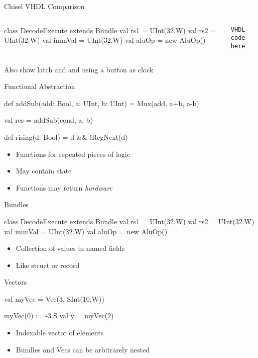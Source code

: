 \documentclass[xcolor=pdflatex,dvipsnames,table]{beamer}
\begin{document}
\begin{frame}[fragile]{Chisel VHDL Comparison}
\begin{columns}
\begin{chisel}
class DecodeExecute extends Bundle {
  val rs1 = UInt(32.W)
  val rs2 = UInt(32.W)
  val immVal = UInt(32.W)
  val aluOp = new AluOp()
}
\end{chisel}
\begin{verbatim}
VHDL code here
\end{verbatim}
\end{columns}
Also show latch and and using a button as clock
\end{frame}


\begin{frame}[fragile]{Functional Abstraction}
\begin{chisel}
  def addSub(add: Bool, a: UInt, b: UInt) =
    Mux(add, a+b, a-b)

  val res = addSub(cond, a, b)
  
  def rising(d: Bool) = d && !RegNext(d)
\end{chisel}
\begin{itemize}
\item Functions for repeated pieces of logic
\item May contain state
\item Functions may return \emph{hardware}
\end{itemize}
\end{frame}


\begin{frame}[fragile]{Bundles}
\begin{chisel}
class DecodeExecute extends Bundle {
  val rs1 = UInt(32.W)
  val rs2 = UInt(32.W)
  val immVal = UInt(32.W)
  val aluOp = new AluOp()
}
\end{chisel}
\begin{itemize}
\item Collection of values in named fields 
\item Like struct or record
\end{itemize}
\end{frame}

\begin{frame}[fragile]{Vectors}
\begin{chisel}
val myVec = Vec(3, SInt(10.W))

myVec(0) := -3.S
val y = myVec(2)
\end{chisel}
\begin{itemize}
\item Indexable vector of elements
\item Bundles and Vecs can be arbitrarely nested
\end{itemize}
\end{frame}
\end{document}

